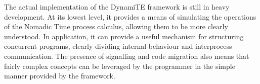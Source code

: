The actual implementation of the DynamiTE framework is still in heavy
development.  At its lowest level, it provides a means of simulating
the operations of the Nomadic Time process calculus, allowing them to
be more clearly understood.  In application, it can provide a useful
mechanism for structuring concurrent programs, clearly dividing
internal behaviour and interprocess communication.  The presence of
signalling and code migration also means that fairly complex concepts
can be leveraged by the programmer in the simple manner provided by
the framework.

